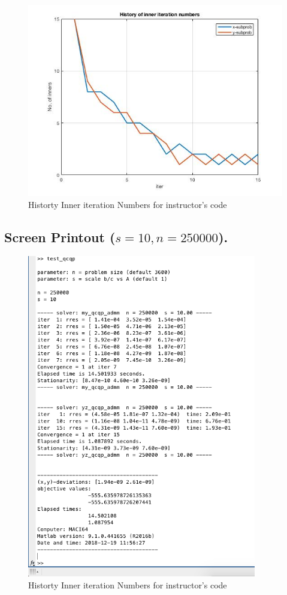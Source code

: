 \begin{figure}[H]
\centering
\includegraphics[width=12cm]{F_12/F_1_4.jpg}
\caption{Historty Inner iteration Numbers for instructor's code}
\end{figure}
\subsection{Screen Printout ($s=10,n=250000$).}
\begin{figure}[H]
\centering
\includegraphics[width=10cm]{F_12/F_1_1.png}
\caption{Historty Inner iteration Numbers for instructor's code}
\end{figure}


